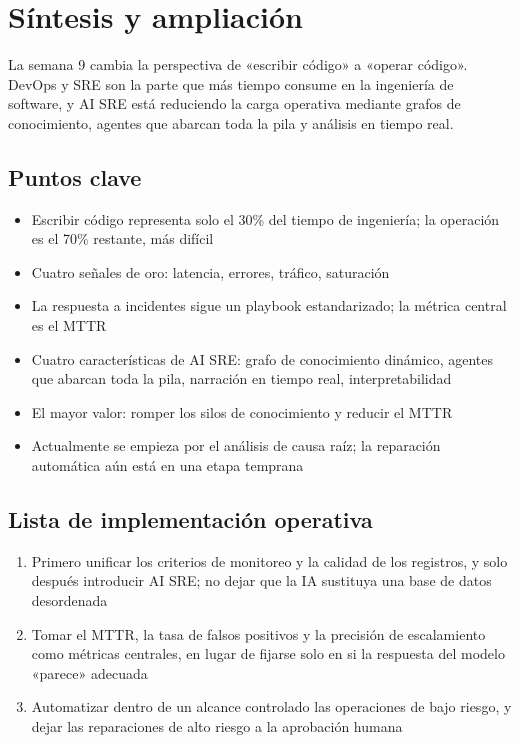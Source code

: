 \section{Síntesis y ampliación}

La semana 9 cambia la perspectiva de «escribir código» a «operar código». DevOps y SRE son la parte que más tiempo consume en la ingeniería de software, y AI SRE está reduciendo la carga operativa mediante grafos de conocimiento, agentes que abarcan toda la pila y análisis en tiempo real.

\subsection{Puntos clave}

\begin{itemize}
    \item Escribir código representa solo el 30\% del tiempo de ingeniería; la operación es el 70\% restante, más difícil
    \item Cuatro señales de oro: latencia, errores, tráfico, saturación
    \item La respuesta a incidentes sigue un playbook estandarizado; la métrica central es el MTTR
    \item Cuatro características de AI SRE: grafo de conocimiento dinámico, agentes que abarcan toda la pila, narración en tiempo real, interpretabilidad
    \item El mayor valor: romper los silos de conocimiento y reducir el MTTR
    \item Actualmente se empieza por el análisis de causa raíz; la reparación automática aún está en una etapa temprana
\end{itemize}

\subsection{Lista de implementación operativa}

\begin{enumerate}
    \item Primero unificar los criterios de monitoreo y la calidad de los registros, y solo después introducir AI SRE; no dejar que la IA sustituya una base de datos desordenada
    \item Tomar el MTTR, la tasa de falsos positivos y la precisión de escalamiento como métricas centrales, en lugar de fijarse solo en si la respuesta del modelo «parece» adecuada
    \item Automatizar dentro de un alcance controlado las operaciones de bajo riesgo, y dejar las reparaciones de alto riesgo a la aprobación humana
\end{enumerate}

